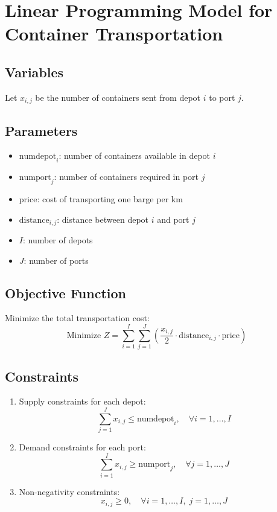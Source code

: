 \documentclass{article}
\begin{document}
\section*{Linear Programming Model for Container Transportation}

\subsection*{Variables}
Let \( x_{i,j} \) be the number of containers sent from depot \( i \) to port \( j \).

\subsection*{Parameters}
\begin{itemize}
    \item \( \text{numdepot}_i \): number of containers available in depot \( i \)
    \item \( \text{numport}_j \): number of containers required in port \( j \)
    \item \( \text{price} \): cost of transporting one barge per km
    \item \( \text{distance}_{i,j} \): distance between depot \( i \) and port \( j \)
    \item \( I \): number of depots
    \item \( J \): number of ports
\end{itemize}

\subsection*{Objective Function}
Minimize the total transportation cost:
\[
\text{Minimize } Z = \sum_{i=1}^{I} \sum_{j=1}^{J} \left( \frac{x_{i,j}}{2} \cdot \text{distance}_{i,j} \cdot \text{price} \right)
\]

\subsection*{Constraints}
\begin{enumerate}
    \item Supply constraints for each depot:
    \[
    \sum_{j=1}^{J} x_{i,j} \leq \text{numdepot}_i, \quad \forall i = 1, \ldots, I
    \]
    \item Demand constraints for each port:
    \[
    \sum_{i=1}^{I} x_{i,j} \geq \text{numport}_j, \quad \forall j = 1, \ldots, J
    \]
    \item Non-negativity constraints:
    \[
    x_{i,j} \geq 0, \quad \forall i = 1, \ldots, I, \; j = 1, \ldots, J
    \]
\end{enumerate}
\end{document}
